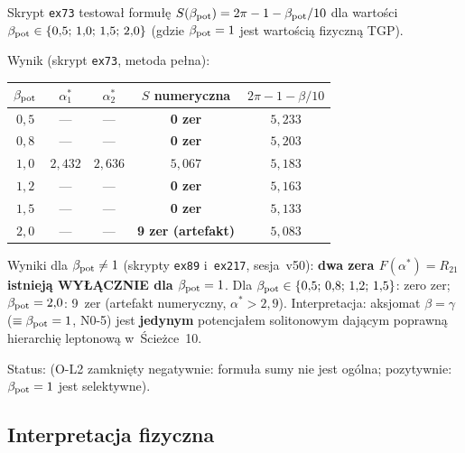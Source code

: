 \begin{result}%
\label{res:L-beta-scan}
Skrypt \texttt{ex73} testował formułę $S(\beta_{\rm pot}) = 2\pi - 1 - \beta_{\rm pot}/10$
dla wartości $\beta_{\rm pot} \in \{0{,}5;\, 1{,}0;\, 1{,}5;\, 2{,}0\}$
(gdzie $\beta_{\rm pot} = 1$ jest wartością fizyczną TGP).

Wynik (skrypt \texttt{ex73}, metoda pełna):

\begin{center}\footnotesize
\begin{tabular}{@{}ccccc@{}}
\toprule
$\beta_{\rm pot}$ & $\alpha^*_1$ & $\alpha^*_2$ & $S$ numeryczna & $2\pi - 1 - \beta/10$ \\
\midrule
$0{,}5$ & --- & --- & \textbf{0 zer} & $5{,}233$ \\
$0{,}8$ & --- & --- & \textbf{0 zer} & $5{,}203$ \\
$1{,}0$ & $2{,}432$ & $2{,}636$ & $5{,}067$ & $5{,}183$ \\
$1{,}2$ & --- & --- & \textbf{0 zer} & $5{,}163$ \\
$1{,}5$ & --- & --- & \textbf{0 zer} & $5{,}133$ \\
$2{,}0$ & --- & --- & \textbf{9 zer (artefakt)} & $5{,}083$ \\
\bottomrule
\end{tabular}
\end{center}

Wyniki dla $\beta_{\rm pot} \neq 1$ (skrypty \texttt{ex89}
i~\texttt{ex217}, sesja~v50):
\textbf{dwa zera $F(\alpha^*)=R_{21}$ istnieją WYŁĄCZNIE
dla $\beta_{\rm pot}=1$}.
Dla $\beta_{\rm pot}\in\{0{,}5;\, 0{,}8;\, 1{,}2;\, 1{,}5\}$:
zero zer; $\beta_{\rm pot}=2{,}0$: 9~zer (artefakt numeryczny,
$\alpha^*>2{,}9$).
Interpretacja: aksjomat $\beta=\gamma$ ($\equiv\beta_{\rm pot}=1$, N0-5)
jest \textbf{jedynym} potencjałem solitonowym dającym poprawną
hierarchię leptonową w~Ścieżce~10.

Status: 
(O-L2 zamknięty negatywnie: formuła sumy nie jest ogólna;
pozytywnie: $\beta_{\rm pot}=1$ jest selektywne).
\end{result}

\subsection{Interpretacja fizyczna}
\label{app:L-fiz}

